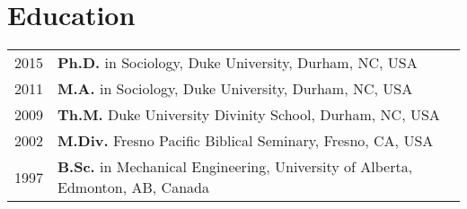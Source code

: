\section*{Education}
\begin{longtable}{p{} p{}}
2015 & \textbf{Ph.D.} in Sociology, Duke University, Durham, NC, USA\\
2011 & \textbf{M.A.} in Sociology, Duke University, Durham, NC, USA \\
2009 & \textbf{Th.M.} Duke University Divinity School, Durham, NC, USA \\
2002 & \textbf{M.Div.} Fresno Pacific Biblical Seminary, Fresno, CA, USA \\
1997 & \textbf{B.Sc.} in Mechanical Engineering, University of Alberta, Edmonton, AB, Canada \\
\end{longtable}